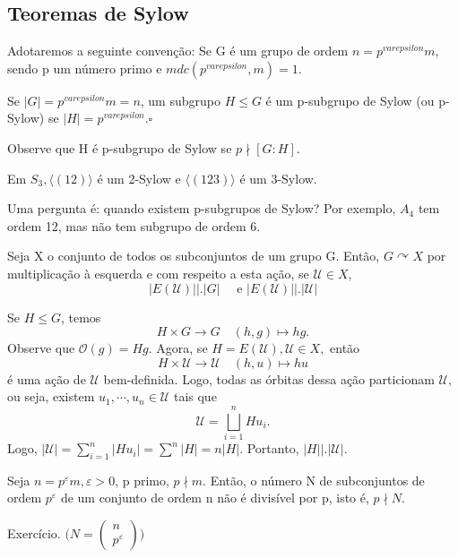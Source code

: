 \documentclass[algebra_notes.tex]{subfiles}
\begin{document}
\subsection{Teoremas de Sylow}
Adotaremos a seguinte convenção: Se G é um grupo de ordem \(n=p^{varepsilon}m\),
sendo p um número primo e \(mdc(p^{varepsilon}, m) = 1.\)
\begin{def*}
	Se \(|G| = p^{varepsilon}m = n\), um subgrupo \(H\leq G\) é um p-subgrupo de Sylow (ou p-Sylow) se
	\(|H| = p^{varepsilon}.\square\)
\end{def*}
Observe que H é p-subgrupo de Sylow se \(p\nmid [G:H].\)
\begin{example*}
	Em \(S_{3}, \langle (12) \rangle\) é um 2-Sylow e \(\langle (123) \rangle\) é um 3-Sylow.
\end{example*}
Uma pergunta é: quando existem p-subgrupos de Sylow? Por exemplo, \(A_{4}\) tem
ordem 12, mas não tem subgrupo de ordem 6.
\begin{lemma*}
	Seja X o conjunto de todos os subconjuntos de um grupo G. Então, \(G \curvearrowright X\) por multiplicação
	à esquerda e com respeito a esta ação, se \(\mathcal{U}\in X,\)
	\[
		|E(\mathcal{U})|\biggl|\biggr.|G|\quad\text{ e } |E(\mathcal{U})|\biggl|\biggr.|\mathcal{U}|
	\]
\end{lemma*}
\begin{proof*}
	Se \(H\leq G\), temos
	\[
		H\times G\rightarrow G\quad (h, g)\mapsto hg.
	\]
	Observe que \(\mathcal{O}(g) = Hg\). Agora, se \(H = E(\mathcal{U}), \mathcal{U}\in X,\) então
	\[
		H\times \mathcal{U}\rightarrow \mathcal{U} \quad (h, u)\mapsto hu
	\]
	é uma ação de \(\mathcal{U}\) bem-definida. Logo, todas as órbitas dessa ação particionam \(\mathcal{U},\) ou seja,
	existem \(u_{1}, \cdots, u_{n}\in \mathcal{U}\) tais que
	\[
		\mathcal{U} = \bigsqcup_{i=1}^{n}{Hu_{i}}.
	\]
	Logo, \(|\mathcal{U}| = \sum\limits_{i=1}^{n}|Hu_{i}| = \sum\limits_{}^{n}|H| = n|H|.\)
	Portanto, \(|H|\biggl|\biggr.|\mathcal{U}|.\) \qedsymbol
\end{proof*}
\begin{lemma*}
	Seja \(n=p^{\varepsilon }m, \varepsilon >0\), p primo, \(p\nmid m.\) Então,
	o número N de subconjuntos de ordem \(p^{\varepsilon }\) de um conjunto de ordem n não
	é divisível por p, isto é, \(p\nmid N\).
\end{lemma*}
\begin{proof*}
	Exercício. \(\biggl(N = \begin{pmatrix}
		n \\
		p^{\varepsilon }
	\end{pmatrix}\biggr)\)
\end{proof*}
\end{document}
